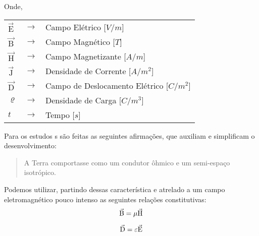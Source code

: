         \noindent Onde,
            
        {\footnotesize \noindent
            \begin{table}[H]
                \begin{tabular*}{1cm}{p{0.05cm}p{0.1cm}p{10cm}}
                    {\footnotesize $\vec{\textrm{E}}$}  & {\footnotesize $\rightarrow$} & {\footnotesize Campo Elétrico [$V/m$] }\\
                    {\footnotesize $\vec{\textrm{B}}$}  & {\footnotesize $\rightarrow$} & {\footnotesize Campo Magnético [$T$] }\\
                    {\footnotesize $\vec{\textrm{H}}$}  & {\footnotesize $\rightarrow$} & {\footnotesize Campo Magnetizante [$A/m$]} \\
                    {\footnotesize $\vec{\textrm{J}}$}  & {\footnotesize $\rightarrow$} & {\footnotesize Densidade de Corrente [$A/m^2$]} \\
                    {\footnotesize $\vec{\textrm{D}}$}  & {\footnotesize $\rightarrow$} & {\footnotesize Campo de Deslocamento Elétrico [$C/m^2$]} \\
                    {\footnotesize $\varrho$}           & {\footnotesize $\rightarrow$} & {\footnotesize Densidade de Carga [$C/m^3$]} \\
                    {\footnotesize $t$ }                & {\footnotesize $\rightarrow$} & {\footnotesize Tempo [$s$]}
                \end{tabular*}
            \end{table}}

        Para os estudos \mt s são feitas as seguintes afirmações, que auxiliam e simplificam o desenvolvimento:
       
        \begin{quote}
            A Terra comportasse como um condutor ôhmico e um semi-espaço isotrópico.
        \end{quote}
        
        Podemos utilizar, partindo dessas característica e atrelado a um campo eletromagnético pouco intenso as seguintes relações constitutivas:
        \begin{equation}
         \vec{\textrm{B}} = \mu \vec{\textrm{H}}
        \end{equation}
        
        \begin{equation}
         \vec{\textrm{D}} = \varepsilon \vec{\textrm{E}}
        \end{equation}
        
